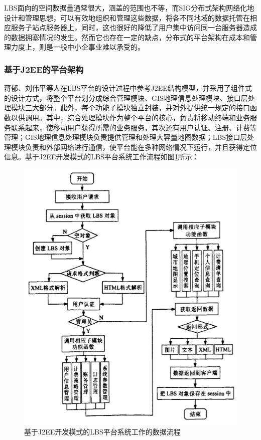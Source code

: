 \documentclass{article}
\begin{document}
\begin{CJK}{UTF8}{gbsn}
	LBS面向的空间数据量通常很大，涵盖的范围也不等，而SIG分布式架构网络化地设计和管理思想，可以有效地组织和管理这些数据，将各不同地域的数据托管在相应服务子站点服务器上，同时，这也很好的降低了用户集中访问同一台服务器造成的数据拥塞情况的发生。然而它也存在一定的缺点，分布式的平台架构在成本和管理力度上，则是一般中小企事业难以承受的。

	\subsubsection{基于J2EE的平台架构}
  蒋郁、刘伟平等人在LBS平台的设计过程中参考J2EE结构模型，并采用了组件式的设计方式，将整个平台划分成综合管理模块、GIS地理信息处理模块、接口层处理模块三大部分。此外，每个功能子模块独立封装，并对外提供统一规定的接口函数以供调用\cite{L06}。其中，综合处理模块作为整个平台的核心，负责将移动终端和业务服务联系起来，使移动用户获得所需的业务服务，其次还有用户认证、注册、计费等管理；GIS地理信息处理模块负责提供管理和处理大容量地图数据；LBS接口层处理模块负责和外部网络进行通信，使平台能在多种网络情况下运行，并且获得定位信息。基于J2EE开发模式的LBS平台系统工作流程如图\ref{fig:L06-2}所示：

	\begin{figure}[htbp]
		\centering
		\includegraphics[bb=0 0 516 621, scale=0.45]{figure/fig_L06-2.png}
		\caption{基于J2EE开发模式的LBS平台系统工作的数据流程}
		\label{fig:L06-2}
	\end{figure}


\end{CJK}
\end{document}

